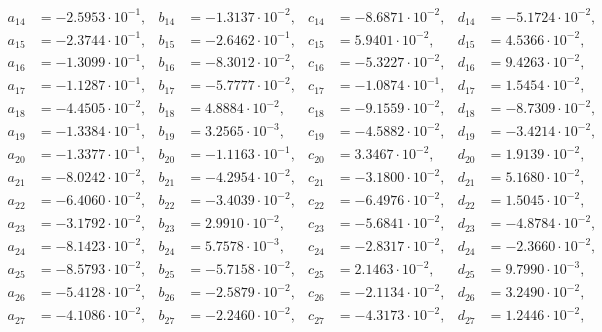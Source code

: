\begin{align*}
  a_{ 14 } &= -2.5953 \cdot 10^{ -1 }, & b_{ 14 } &= -1.3137 \cdot 10^{ -2 }, & c_{ 14 } &= -8.6871 \cdot 10^{ -2 }, & d_{ 14 } &= -5.1724 \cdot 10^{ -2 }, \\ 
  a_{ 15 } &= -2.3744 \cdot 10^{ -1 }, & b_{ 15 } &= -2.6462 \cdot 10^{ -1 }, & c_{ 15 } &= 5.9401 \cdot 10^{ -2 }, & d_{ 15 } &= 4.5366 \cdot 10^{ -2 }, \\ 
  a_{ 16 } &= -1.3099 \cdot 10^{ -1 }, & b_{ 16 } &= -8.3012 \cdot 10^{ -2 }, & c_{ 16 } &= -5.3227 \cdot 10^{ -2 }, & d_{ 16 } &= 9.4263 \cdot 10^{ -2 }, \\ 
  a_{ 17 } &= -1.1287 \cdot 10^{ -1 }, & b_{ 17 } &= -5.7777 \cdot 10^{ -2 }, & c_{ 17 } &= -1.0874 \cdot 10^{ -1 }, & d_{ 17 } &= 1.5454 \cdot 10^{ -2 }, \\ 
  a_{ 18 } &= -4.4505 \cdot 10^{ -2 }, & b_{ 18 } &= 4.8884 \cdot 10^{ -2 }, & c_{ 18 } &= -9.1559 \cdot 10^{ -2 }, & d_{ 18 } &= -8.7309 \cdot 10^{ -2 }, \\ 
  a_{ 19 } &= -1.3384 \cdot 10^{ -1 }, & b_{ 19 } &= 3.2565 \cdot 10^{ -3 }, & c_{ 19 } &= -4.5882 \cdot 10^{ -2 }, & d_{ 19 } &= -3.4214 \cdot 10^{ -2 }, \\ 
  a_{ 20 } &= -1.3377 \cdot 10^{ -1 }, & b_{ 20 } &= -1.1163 \cdot 10^{ -1 }, & c_{ 20 } &= 3.3467 \cdot 10^{ -2 }, & d_{ 20 } &= 1.9139 \cdot 10^{ -2 }, \\ 
  a_{ 21 } &= -8.0242 \cdot 10^{ -2 }, & b_{ 21 } &= -4.2954 \cdot 10^{ -2 }, & c_{ 21 } &= -3.1800 \cdot 10^{ -2 }, & d_{ 21 } &= 5.1680 \cdot 10^{ -2 }, \\ 
  a_{ 22 } &= -6.4060 \cdot 10^{ -2 }, & b_{ 22 } &= -3.4039 \cdot 10^{ -2 }, & c_{ 22 } &= -6.4976 \cdot 10^{ -2 }, & d_{ 22 } &= 1.5045 \cdot 10^{ -2 }, \\ 
  a_{ 23 } &= -3.1792 \cdot 10^{ -2 }, & b_{ 23 } &= 2.9910 \cdot 10^{ -2 }, & c_{ 23 } &= -5.6841 \cdot 10^{ -2 }, & d_{ 23 } &= -4.8784 \cdot 10^{ -2 }, \\ 
  a_{ 24 } &= -8.1423 \cdot 10^{ -2 }, & b_{ 24 } &= 5.7578 \cdot 10^{ -3 }, & c_{ 24 } &= -2.8317 \cdot 10^{ -2 }, & d_{ 24 } &= -2.3660 \cdot 10^{ -2 }, \\ 
  a_{ 25 } &= -8.5793 \cdot 10^{ -2 }, & b_{ 25 } &= -5.7158 \cdot 10^{ -2 }, & c_{ 25 } &= 2.1463 \cdot 10^{ -2 }, & d_{ 25 } &= 9.7990 \cdot 10^{ -3 }, \\ 
  a_{ 26 } &= -5.4128 \cdot 10^{ -2 }, & b_{ 26 } &= -2.5879 \cdot 10^{ -2 }, & c_{ 26 } &= -2.1134 \cdot 10^{ -2 }, & d_{ 26 } &= 3.2490 \cdot 10^{ -2 }, \\ 
  a_{ 27 } &= -4.1086 \cdot 10^{ -2 }, & b_{ 27 } &= -2.2460 \cdot 10^{ -2 }, & c_{ 27 } &= -4.3173 \cdot 10^{ -2 }, & d_{ 27 } &= 1.2446 \cdot 10^{ -2 }, \\ 

\end{align*}
